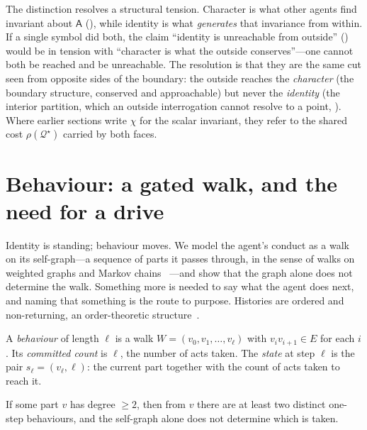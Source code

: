 \documentclass[11pt,twocolumn,a4paper]{article}
\newcommand{\Agent}{\mathsf{A}}
\newcommand{\E}{E}
\newcommand{\Char}{\chi}             %
\newcommand{\state}{s}
\begin{document}
\begin{remark}
\label{rem:idchar}
The distinction resolves a structural tension. Character is what other
agents find invariant about $\Agent$ (), while
identity is what \emph{generates} that invariance from within. If a single
symbol did both, the claim ``identity is unreachable from outside''
() would be in tension with ``character is what the
outside conserves''---one cannot both be reached and be unreachable. The
resolution is that they are the same cut seen from opposite sides of the
boundary: the outside reaches the \emph{character} (the boundary structure,
conserved and approachable) but never the \emph{identity} (the interior
partition, which an outside interrogation cannot resolve to a point,
). Where earlier sections write $\Char$ for the
scalar invariant, they refer to the shared cost $\rho(\mathcal{Q}^\star)$
carried by both faces.
\end{remark}

\section{Behaviour: a gated walk, and the need for a drive}
\label{sec:behaviour}

Identity is standing; behaviour moves. We model the agent's conduct as a
walk on its self-graph---a sequence of parts it passes through, in the
sense of walks on weighted graphs and Markov chains~\cite{levinperes2017}%
---and show that the graph alone does not determine the walk. Something
more is needed to say what the agent does next, and naming that something
is the route to purpose. Histories are ordered and non-returning, an
order-theoretic structure~\cite{daveypriestley2002}.

\begin{definition}
\label{def:walk}
A \emph{behaviour} of length $\ell$ is a walk $W=(v_0,v_1,\dots,v_\ell)$
with $v_iv_{i+1}\in\E$ for each $i$. Its \emph{committed count} is
$\ell$, the number of acts taken. The \emph{state} at step $\ell$ is the
pair $\state_\ell=(v_\ell,\ell)$: the current part together with the
count of acts taken to reach it.
\end{definition}

\begin{lemma}
\label{lem:branch}
If some part $v$ has degree $\ge2$, then from $v$ there are at least two
distinct one-step behaviours, and the self-graph alone does not determine
which is taken.
\end{lemma}
\end{document}
